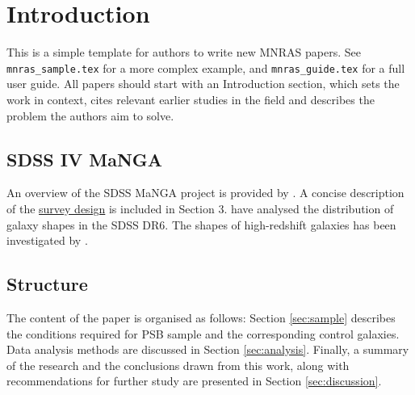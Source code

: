 \section{Introduction}
\label{sec:introduction}

\par This is a simple template for authors to write new MNRAS papers.
See \texttt{mnras\_sample.tex} for a more complex example, and \texttt{mnras\_guide.tex}
for a full user guide. All papers should start with an Introduction section, which sets the work in context, cites relevant earlier studies in the field and describes the problem the authors aim to solve.

\subsection{SDSS IV MaNGA}
An overview of the SDSS MaNGA project is provided by \citet{Bundy_2014}. A concise description of the \href{https://iopscience.iop.org/article/10.1088/0004-637X/798/1/7/meta#apj504473s3}{survey design} is included in Section 3. \citet{2008MNRAS.388.1321P} have analysed the distribution of galaxy shapes in the SDSS DR6. The shapes of high-redshift galaxies has been investigated by \citet{2012ApJ...754L..24C}.



\subsection{Structure}
The content of the paper is organised as follows: Section \ref{sec:sample} describes the conditions required for PSB sample and the corresponding control galaxies. Data analysis methods are discussed in Section \ref{sec:analysis}. Finally, a summary of the research and the conclusions drawn from this work, along with recommendations for further study are presented in Section \ref{sec:discussion}.
